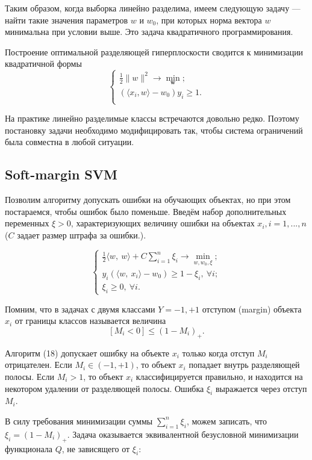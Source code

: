 \documentclass[12pt]{article}
\begin{document}
	Таким образом, когда выборка линейно разделима, имеем следующую задачу --- найти такие значения параметров $w$ и $w_0$, при которых норма вектора $w$ минимальна при условии выше. Это задача квадратичного программирования. 
	
	Построение оптимальной разделяющей гиперплоскости сводится к минимизации квадратичной формы
	$$
	\begin{cases}
		\frac{1}{2}\lVert w \rVert^2 \rightarrow \min\limits_{\boldsymbol{w}};\\
		\left(\langle{x}_i,{w}\rangle - w_0\right)y_i \geq 1. \\
	\end{cases}
	$$
	
	На практике линейно разделимые классы встречаются довольно редко. Поэтому постановку задачи необходимо модифицировать так, чтобы система ограничений была совместна в любой ситуации.
	
	\newpage
			
	\subsection{Soft-margin SVM}
	
	Позволим алгоритму допускать ошибки на обучающих объектах, но при этом постараемся, чтобы ошибок было поменьше. Введём набор дополнительных переменных $\xi > 0$, характеризующих величину ошибки на объектах $x_i, i = 1,... ,n$ ($C$ задает размер штрафа за ошибки.). 
	
	$$ 
	\begin{cases}
		\frac{1}{2}\langle w,\ w\rangle+C\sum_{i=1}^{n}\xi_{i}\rightarrow \underset{w,w_{0},\xi} \min ;\\
		y_{i}(\langle w,\ x_{i}\rangle-w_{0})\geq 1-\xi_{i},\ \forall i;\\
		\xi_{i}\geq 0,\ \forall i.
	\end{cases}
	$$
	
	Помним, что в задачах с двумя классами $Y = {-1, +1}$ отступом (margin) объекта $x_i$ от границы классов называется величина
	$$
	[M_{i}<0]\leq(1-M_{i})_{+}.
	$$
	
	Алгоритм (18) допускает ошибку на объекте $x_i$ только когда отступ $M_i$ отрицателен.  Если $M_i \in (-1, +1)$, то объект $x_i$ попадает внутрь разделяющей полосы. Если $M_i > 1$, то объект  $x_i$ классифицируется правильно, и находится на некотором удалении от разделяющей полосы. Ошибка $\xi_i$ выражается через отступ $M_i$.  
	
	В силу требования минимизации суммы $\sum_{i=1}^{n} \xi_i$, можем записать, что $\xi_i = (1 - M_i)_+$. Задача оказывается эквивалентной безусловной минимизации функционала $Q$, не зависящего от $\xi_i$:
	
\end{document}
